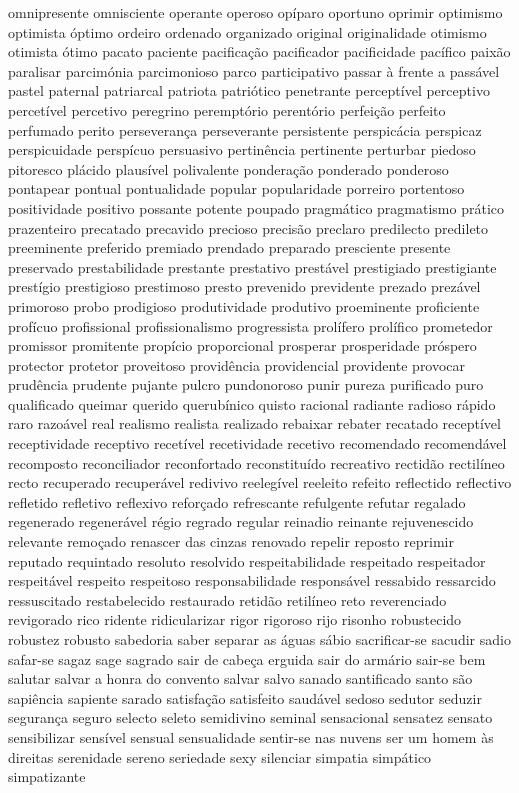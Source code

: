 \documentclass[ruledheader]{abnt_UFF}
\begin{document}
omnipresente omnisciente operante operoso op\'{i}paro oportuno oprimir optimismo optimista \'{o}ptimo ordeiro ordenado organizado original originalidade otimismo otimista \'{o}timo pacato paciente pacifica\c{c}\~ao pacificador pacificidade pac\'{i}fico paix\~ao paralisar parcim\'{o}nia parcimonioso parco participativo passar \`{a} frente a pass\'{a}vel pastel paternal patriarcal patriota patri\'{o}tico penetrante percept\'{i}vel perceptivo percet\'{i}vel percetivo peregrino perempt\'{o}rio perent\'{o}rio perfei\c{c}\~ao perfeito perfumado perito perseveran\c{c}a perseverante persistente perspic\'{a}cia perspicaz perspicuidade persp\'{i}cuo persuasivo pertin\^{e}ncia pertinente perturbar piedoso pitoresco pl\'{a}cido plaus\'{i}vel polivalente pondera\c{c}\~ao ponderado ponderoso pontapear pontual pontualidade popular popularidade porreiro portentoso positividade positivo possante potente poupado pragm\'{a}tico pragmatismo pr\'{a}tico prazenteiro precatado precavido precioso precis\~ao preclaro predilecto predileto preeminente preferido premiado prendado preparado presciente presente preservado prestabilidade prestante prestativo prest\'{a}vel prestigiado prestigiante prest\'{i}gio prestigioso prestimoso presto prevenido previdente prezado prez\'{a}vel primoroso probo prodigioso produtividade produtivo proeminente proficiente prof\'{i}cuo profissional profissionalismo progressista prol\'{i}fero prol\'{i}fico prometedor promissor promitente prop\'{i}cio proporcional prosperar prosperidade pr\'{o}spero protector protetor proveitoso provid\^{e}ncia providencial providente provocar prud\^{e}ncia prudente pujante pulcro pundonoroso punir pureza purificado puro qualificado queimar querido querub\'{i}nico quisto racional radiante radioso r\'{a}pido raro razo\'{a}vel real realismo realista realizado rebaixar rebater recatado recept\'{i}vel receptividade receptivo recet\'{i}vel recetividade recetivo recomendado recomend\'{a}vel recomposto reconciliador reconfortado reconstitu\'{i}do recreativo rectid\~ao rectil\'{i}neo recto recuperado recuper\'{a}vel redivivo reeleg\'{i}vel reeleito refeito reflectido reflectivo refletido refletivo reflexivo refor\c{c}ado refrescante refulgente refutar regalado regenerado regener\'{a}vel r\'{e}gio regrado regular reinadio reinante rejuvenescido relevante remo\c{c}ado renascer das cinzas renovado repelir reposto reprimir reputado requintado resoluto resolvido respeitabilidade respeitado respeitador respeit\'{a}vel respeito respeitoso responsabilidade respons\'{a}vel ressabido ressarcido ressuscitado restabelecido restaurado retid\~ao retil\'{i}neo reto reverenciado revigorado rico ridente ridicularizar rigor rigoroso rijo risonho robustecido robustez robusto sabedoria saber separar as \'{a}guas s\'{a}bio sacrificar-se sacudir sadio safar-se sagaz sage sagrado sair de cabe\c{c}a erguida sair do arm\'{a}rio sair-se bem salutar salvar a honra do convento salvar salvo sanado santificado santo s\~ao sapi\^{e}ncia sapiente sarado satisfa\c{c}\~ao satisfeito saud\'{a}vel sedoso sedutor seduzir seguran\c{c}a seguro selecto seleto semidivino seminal sensacional sensatez sensato sensibilizar sens\'{i}vel sensual sensualidade sentir-se nas nuvens ser um homem \`{a}s direitas serenidade sereno seriedade sexy silenciar simpatia simp\'{a}tico simpatizante 
\end{document}

